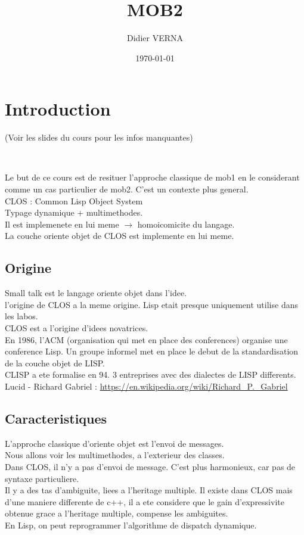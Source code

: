 \documentclass[a4paper,11pt]{article}
\title{MOB2}
\author{Didier VERNA}
\date{\today}
\begin{document}
\maketitle
\tableofcontents



\section{Introduction}
(Voir les slides du cours pour les infos manquantes)

\

Le but de ce cours est de resituer l'approche classique de mob1 en le considerant comme un cas particulier de mob2.
C'est un contexte plus general.\\
CLOS : Common Lisp Object System\\
Typage dynamique + multimethodes.\\
Il est implemenete en lui meme $\rightarrow$ homoicomicite du langage.\\
La couche oriente objet de CLOS est implemente en lui meme.\\
\subsection{Origine}
Small talk est le langage oriente objet dans l'idee.\\
l'origine de CLOS a la meme origine. Lisp etait presque uniquement utilise dans les labos.\\
CLOS est a l'origine d'idees novatrices.\\

En 1986, l'ACM (organisation qui met en place des conferences) organise une conference Lisp. Un groupe informel met en place le debut de la standardisation  de la couche objet de LISP.\\
CLISP a ete formalise en 94. 3 entreprises avec des dialectes de LISP differents.\\
Lucid - Richard Gabriel : \url{https://en.wikipedia.org/wiki/Richard_P._Gabriel}\\
\subsection{Caracteristiques}
L'approche classique d'oriente objet est l'envoi de messages.\\
Nous allons voir les multimethodes, a l'exterieur des classes.\\
Dans CLOS, il n'y a pas d'envoi de message. C'est plus harmonieux, car pas de syntaxe particuliere.\\
Il y a des tas d'ambiguite, liees a l'heritage multiple. Il existe dans CLOS mais d'une maniere differente de c++, il a ete considere que le gain d'expressivite obtenue grace a l'heritage multiple, compense les ambiguites.\\
En Lisp, on peut reprogrammer l'algorithme de dispatch dynamique.\\
\end{document}
